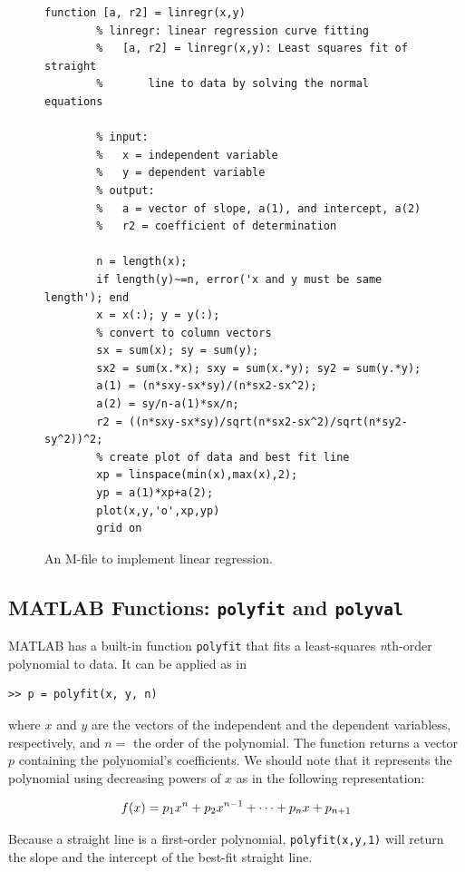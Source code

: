 \documentclass[../main.tex]{subfiles}
\begin{document}
\begin{figure}[H]
	\centering
	\begin{lstlisting}[numbers=none]
		function [a, r2] = linregr(x,y)
		% linregr: linear regression curve fitting
		%	[a, r2] = linregr(x,y): Least squares fit of straight
		%		line to data by solving the normal equations

		% input:
		%	x = independent variable
		%	y = dependent variable
		% output:
		%	a = vector of slope, a(1), and intercept, a(2)
		%	r2 = coefficient of determination

		n = length(x);
		if length(y)~=n, error('x and y must be same length'); end
		x = x(:); y = y(:);
		% convert to column vectors
		sx = sum(x); sy = sum(y);
		sx2 = sum(x.*x); sxy = sum(x.*y); sy2 = sum(y.*y);
		a(1) = (n*sxy-sx*sy)/(n*sx2-sx^2);
		a(2) = sy/n-a(1)*sx/n;
		r2 = ((n*sxy-sx*sy)/sqrt(n*sx2-sx^2)/sqrt(n*sy2-sy^2))^2;
		% create plot of data and best fit line
		xp = linspace(min(x),max(x),2);
		yp = a(1)*xp+a(2);
		plot(x,y,'o',xp,yp)
		grid on
	\end{lstlisting}
	\caption{\textsf{An M-file to implement linear regression.}}
	\label{fig:fig_14_15}
\end{figure}

\label{cha:cha_P_14_5_2} %
\subsection{MATLAB Functions: \texttt{polyfit} and \texttt{polyval}}

\noindent MATLAB has a built-in function \texttt{polyfit} that fits a least-squares \textit{n}th-order polynomial to data. It can be applied as in

\begin{lstlisting}[numbers=none]
>> p = polyfit(x, y, n)
\end{lstlisting}

\noindent where $x$ and $y$ are the vectors of the independent and the dependent variabless, respectively, and $n =$ the order of the polynomial. The function returns a vector $p$ containing the polynomial's coefficients. We should note that it represents the polynomial using decreasing powers of $x$ as in the following representation:

\begin{equation}
	\notag
	f(x) = p_1x^n + p_2x^{n-1} + \cdots + p_n x + p_{n + 1}
\end{equation}

Because a straight line is a first-order polynomial, \verb|polyfit(x,y,1)| will return the slope and the intercept of the best-fit straight line.
\end{document}
